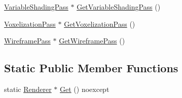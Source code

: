 \begin{DoxyCompactItemize}
\item 
\hyperlink{classmage_1_1_variable_shading_pass}{Variable\+Shading\+Pass} $\ast$ \hyperlink{classmage_1_1_renderer_aaea6458a480c62f8b0b911f16e5058b9}{Get\+Variable\+Shading\+Pass} ()
\item 
\hyperlink{classmage_1_1_voxelization_pass}{Voxelization\+Pass} $\ast$ \hyperlink{classmage_1_1_renderer_a911673ea96e3182e0d2389d3f02603a2}{Get\+Voxelization\+Pass} ()
\item 
\hyperlink{classmage_1_1_wireframe_pass}{Wireframe\+Pass} $\ast$ \hyperlink{classmage_1_1_renderer_a8069fab64b56b69dca3d9a8a5ebc3f8e}{Get\+Wireframe\+Pass} ()
\end{DoxyCompactItemize}
\subsection*{Static Public Member Functions}
\begin{DoxyCompactItemize}
\item 
static \hyperlink{classmage_1_1_renderer}{Renderer} $\ast$ \hyperlink{classmage_1_1_renderer_a401f8e17f60d8546b30de22943ac35db}{Get} () noexcept
\end{DoxyCompactItemize}
